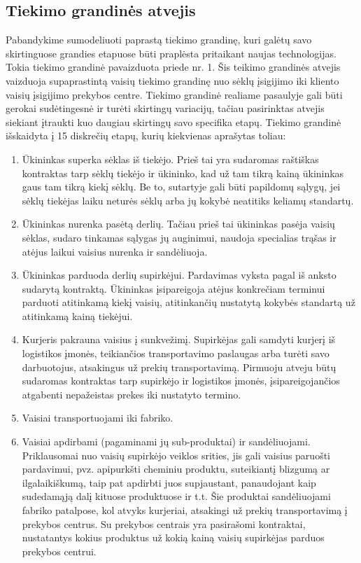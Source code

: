 \subsection{Tiekimo grandinės atvejis}
Pabandykime sumodeliuoti paprastą tiekimo grandinę, kuri galėtų savo skirtinguose grandies etapuose būti praplėsta pritaikant naujas technologijas. Tokia tiekimo grandinė pavaizduota priede nr. 1. Šis teikimo grandinės atvejis vaizduoja supaprastintą vaisių tiekimo grandinę nuo sėklų įsigijimo iki kliento vaisių įsigijimo prekybos centre. Tiekimo grandinė realiame pasaulyje gali būti gerokai sudėtingesnė ir turėti skirtingų variacijų, tačiau pasirinktas atvejis siekiant įtraukti kuo daugiau skirtingų savo specifika etapų. Tiekimo grandinė išskaidyta į 15 diskrečių etapų, kurių kiekvienas aprašytas toliau:
\begin{enumerate}
    \item Ūkininkas superka sėklas iš tiekėjo. Prieš tai yra sudaromas raštiškas kontraktas tarp sėklų tiekėjo ir ūkininko, kad už tam tikrą kainą ūkininkas gaus tam tikrą kiekį sėklų. Be to, sutartyje gali būti papildomų sąlygų, jei sėklų tiekėjas laiku neturės sėklų arba jų kokybė neatitiks keliamų standartų.
    \item Ūkininkas nurenka pasėtą derlių. Tačiau prieš tai ūkininkas pasėja vaisių sėklas, sudaro tinkamas sąlygas jų auginimui, naudoja specialias trąšas ir atėjus laikui vaisius nurenka ir sandėliuoja.
    \item Ūkininkas parduoda derlių supirkėjui. Pardavimas vyksta pagal iš anksto sudarytą kontraktą. Ūkininkas įsipareigoja atėjus konkrečiam terminui parduoti atitinkamą kiekį vaisių, atitinkančių nustatytą kokybės standartą už atitinkamą kainą tiekėjui.
    \item Kurjeris pakrauna vaisius į sunkvežimį. Supirkėjas gali samdyti kurjerį iš logistikos įmonės, teikiančios transportavimo paslaugas arba turėti savo darbuotojus, atsakingus už prekių transportavimą. Pirmuoju atveju būtų sudaromas kontraktas tarp supirkėjo ir logistikos įmonės, įsipareigojančios atgabenti nepažeistas prekes iki nustatyto termino.
    \item Vaisiai transportuojami iki fabriko.
    \item Vaisiai apdirbami (pagaminami jų sub-produktai) ir sandėliuojami. Priklausomai nuo vaisių supirkėjo veiklos srities, jis gali vaisius paruošti pardavimui, pvz. apipurkšti cheminiu produktu, suteikiantį blizgumą ar ilgalaikiškumą, taip pat apdirbti juos supjaustant, panaudojant kaip sudedamąją dalį kituose produktuose ir t.t. Šie produktai sandėliuojami fabriko patalpose, kol atvyks kurjeriai, atsakingi už prekių transportavimą į prekybos centrus. Su prekybos centrais yra pasirašomi kontraktai, nustatantys kokius produktus už kokią kainą vaisių supirkėjas parduos prekybos centrui.

\end{enumerate}
